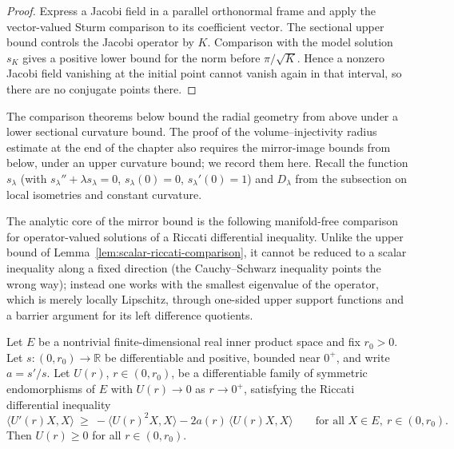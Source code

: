 \begin{proof}
\sketch

Express a Jacobi field in a parallel orthonormal frame and apply the vector-valued Sturm comparison to its coefficient vector. The sectional upper bound controls the Jacobi operator by $K$. Comparison with the model solution $s_K$ gives a positive lower bound for the norm before $\pi/\sqrt K$. Hence a nonzero Jacobi field vanishing at the initial point cannot vanish again in that interval, so there are no conjugate points there.
\end{proof}

The comparison theorems below bound the radial geometry from above
under a lower sectional curvature bound. The proof of the
volume--injectivity radius estimate at the end of the chapter also
requires the mirror-image bounds from below, under an upper
curvature bound; we record them here. Recall the function
$s_\lambda$ (with $s_\lambda''+\lambda s_\lambda=0$,
$s_\lambda(0)=0$, $s_\lambda'(0)=1$) and $D_\lambda$ from the
subsection on local isometries and constant curvature.

The analytic core of the mirror bound is the following
manifold-free comparison for operator-valued solutions of a Riccati
differential inequality. Unlike the upper bound of
Lemma~\ref{lem:scalar-riccati-comparison}, it cannot be reduced to
a scalar inequality along a fixed direction (the Cauchy--Schwarz
inequality points the wrong way); instead one works with the
smallest eigenvalue of the operator, which is merely locally
Lipschitz, through one-sided upper support functions and a barrier
argument for its left difference quotients.

\begin{lemma}
\label{lem:operator-riccati-lower}




Let $E$ be a nontrivial finite-dimensional real inner product space
and fix $r_0>0$. Let $s\colon(0,r_0)\to\mathbb R$ be differentiable
and positive, bounded near $0^+$, and write $a=s'/s$. Let $U(r)$,
$r\in(0,r_0)$, be a differentiable family of symmetric
endomorphisms of $E$ with $U(r)\to0$ as $r\to0^+$, satisfying the
Riccati differential inequality
$$\langle U'(r)X,X\rangle\ \ge\
-\langle U(r)^2X,X\rangle-2a(r)\,\langle U(r)X,X\rangle
\qquad\text{for all }X\in E,\ r\in(0,r_0).$$
Then $U(r)\ge0$ for all $r\in(0,r_0)$.
\end{lemma}

